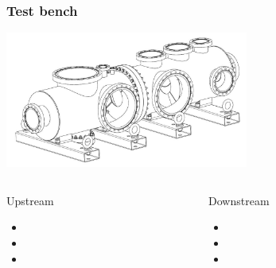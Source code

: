 \begin{frame}
  \frametitle{Test bench}
  \includegraphics[width=0.6\textwidth]{04_Test/fig/fig000_Testbench.png}
  \begin{columns}
    \begin{column}{0.45\textwidth}
      \begin{block}{Upstream}
        \begin{itemize}
          \item
          \item
          \item
        \end{itemize}
      \end{block}
    \end{column}

    \begin{column}{0.45\textwidth}
      \begin{block}{Downstream}
        \begin{itemize}
          \item
          \item
          \item
        \end{itemize}
      \end{block}
    \end{column}
  \end{columns}

\end{frame}


